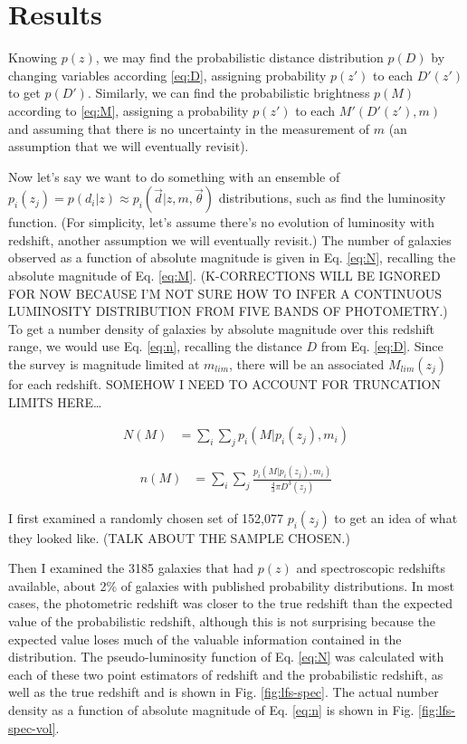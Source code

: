 \documentclass[12pt, onecolumn]{emulateapj}
\begin{document}
\section{Results}

Knowing $p(z)$, we may find the probabilistic distance distribution $p(D)$ by changing variables according \ref{eq:D}, assigning probability $p(z')$ to each $D'(z')$ to get $p(D')$.  Similarly, we can find the probabilistic brightness $p(M)$ according to \ref{eq:M}, assigning a probability $p(z')$ to each $M'(D'(z'),m)$ and assuming that there is no uncertainty in the measurement of $m$ (an assumption that we will eventually revisit).  

Now let's say we want to do something with an ensemble of $p_{i}(z_{j})=p(d_{i}|z)\approx p_{i}(\vec{d}|z,m,\vec{\theta})$ distributions, such as find the luminosity function.  (For simplicity, let's assume there's no evolution of luminosity with redshift, another assumption we will eventually revisit.)  The number of galaxies observed as a function of absolute magnitude is given in Eq. \ref{eq:N}, recalling the absolute magnitude of Eq. \ref{eq:M}.  (K-CORRECTIONS WILL BE IGNORED FOR NOW BECAUSE I'M NOT SURE HOW TO INFER A CONTINUOUS LUMINOSITY DISTRIBUTION FROM FIVE BANDS OF PHOTOMETRY.)  To get a number density of galaxies by absolute magnitude over this redshift range, we would use Eq. \ref{eq:n}, recalling the distance $D$ from Eq. \ref{eq:D}.  Since the survey is magnitude limited at $m_{lim}$, there will be an associated $M_{lim}(z_{j})$ for each redshift.  SOMEHOW I NEED TO ACCOUNT FOR TRUNCATION LIMITS HERE\dots

\begin{eqnarray}
\label{eq:N}
N(M) &= \sum_{i}\sum_{j}p_{i}(M|p_{i}(z_{j}),m_{i})
\end{eqnarray}

\begin{eqnarray}
\label{eq:n}
n(M) &= \sum_{i}\sum_{j}\frac{p_{i}(M|p_{i}(z_{j}),m_{i})}{\frac{4}{3}\pi D^{3}(z_{j})}
\end{eqnarray}

I first examined a randomly chosen set of 152,077 $p_{i}(z_{j})$ to get an idea of what they looked like.  (TALK ABOUT THE SAMPLE CHOSEN.)

Then I examined the 3185 galaxies that had $p(z)$ and spectroscopic redshifts available, about 2\% of galaxies with published probability distributions.  In most cases, the photometric redshift was closer to the true redshift than the expected value of the probabilistic redshift, although this is not surprising because the expected value loses much of the valuable information contained in the distribution.  The pseudo-luminosity function of Eq. \ref{eq:N} was calculated with each of these two point estimators of redshift and the probabilistic redshift, as well as the true redshift and is shown in Fig. \ref{fig:lfs-spec}.  The actual number density as a function of absolute magnitude of Eq. \ref{eq:n} is shown in Fig. \ref{fig:lfs-spec-vol}.
\end{document}
